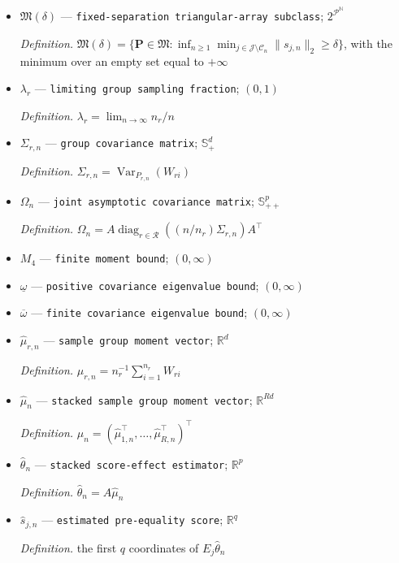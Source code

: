 \documentclass{article}
\begin{document}
\begin{itemize}
  \item \(\mathfrak M(\delta)\) --- \texttt{fixed-\allowbreak{}separation triangular-\allowbreak{}array subclass}; \(2^{\mathcal P^{\mathbb N}}\)
  \par\smallskip\noindent\emph{Definition.} \(\mathfrak M(\delta)=\{\mathbf P\in\mathfrak M:\inf_{n\ge1}\min_{j\in\mathcal J\setminus\mathcal C_n}\|s_{j,n}\|_2\ge\delta\}\), with the minimum over an empty set equal to \(+\infty\)
  \item \(\lambda_r\) --- \texttt{limiting group sampling fraction}; \((0,1)\)
  \par\smallskip\noindent\emph{Definition.} \(\lambda_r=\lim_{n\to\infty}n_r/n\)
  \item \(\Sigma_{r,n}\) --- \texttt{group covariance matrix}; \(\mathbb S_+^d\)
  \par\smallskip\noindent\emph{Definition.} \(\Sigma_{r,n}=\operatorname{Var}_{P_{r,n}}(W_{ri})\)
  \item \(\Omega_n\) --- \texttt{joint asymptotic covariance matrix}; \(\mathbb S_{++}^p\)
  \par\smallskip\noindent\emph{Definition.} \(\Omega_n=A\operatorname{diag}_{r\in\mathcal R}((n/n_r)\Sigma_{r,n})A^{\top}\)
  \item \(M_4\) --- \texttt{finite moment bound}; \((0,\infty)\)
  \item \(\underline\omega\) --- \texttt{positive covariance eigenvalue bound}; \((0,\infty)\)
  \item \(\overline\omega\) --- \texttt{finite covariance eigenvalue bound}; \((0,\infty)\)
  \item \(\widehat\mu_{r,n}\) --- \texttt{sample group moment vector}; \(\mathbb R^d\)
  \par\smallskip\noindent\emph{Definition.} \(\widehat\mu_{r,n}=n_r^{-1}\sum_{i=1}^{n_r}W_{ri}\)
  \item \(\widehat\mu_n\) --- \texttt{stacked sample group moment vector}; \(\mathbb R^{Rd}\)
  \par\smallskip\noindent\emph{Definition.} \(\widehat\mu_n=(\widehat\mu_{1,n}^{\top},\ldots,\widehat\mu_{R,n}^{\top})^{\top}\)
  \item \(\widehat\theta_n\) --- \texttt{stacked score-\allowbreak{}effect estimator}; \(\mathbb R^p\)
  \par\smallskip\noindent\emph{Definition.} \(\widehat\theta_n=A\widehat\mu_n\)
  \item \(\widehat s_{j,n}\) --- \texttt{estimated pre-\allowbreak{}equality score}; \(\mathbb R^q\)
  \par\smallskip\noindent\emph{Definition.} the first \(q\) coordinates of \(E_j\widehat\theta_n\)

\end{itemize}
\end{document}
